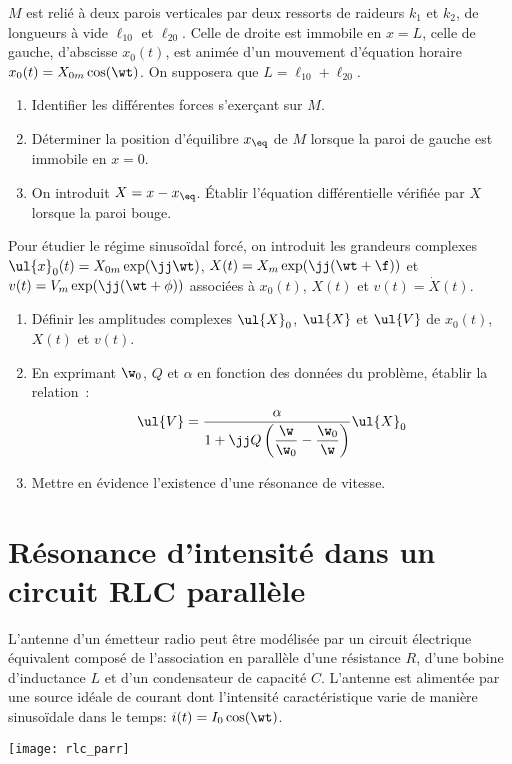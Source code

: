 \documentclass[a4paper, 12pt, final, garamond]{book}
\begin{document}
$M$ est relié à deux parois verticales par deux ressorts de raideurs $k_1$
et $k_2$, de longueurs à vide $\ell_{10}$ et $\ell_{20}$. Celle de droite est
immobile en $x = L$, celle de gauche, d'abscisse $x_0 (t)$, est animée d'un
mouvement d'équation horaire $x_0 (t) = X_{0m} \cos(\wt)$. On supposera
que $L = \ell_{10} + \ell_{20}$.

\begin{enumerate}
    \item Identifier les différentes forces s'exerçant sur $M$.
    \item Déterminer la position d'équilibre $x_{\eq}$ de $M$ lorsque la paroi
        de gauche est immobile en $x = 0$.
    \item On introduit $X = x - x_{\eq}$. Établir l'équation différentielle
        vérifiée par $X$ lorsque la paroi bouge.
\end{enumerate}
    Pour étudier le régime sinusoïdal forcé, on introduit les grandeurs
    complexes $\ul{x}_0(t) = X_{0m} \exp(\jj\wt)$, $X(t) = X_m \exp(\jj(\wt +
    \f))$ et $v(t) = V_m \exp(\jj(\wt + \phi))$ associées à $x_0(t)$, $X(t)$ et
    $v(t) = \dot X(t)$.
\begin{enumerate}[resume]
    \item Définir les amplitudes complexes $\ul{X}_0$, $\ul{X}$ et $\ul{V}$ de
        $x_0(t)$, $X(t)$ et $v(t)$.
    \item En exprimant $\w_0$, $Q$ et $\alpha$ en fonction des données du
        problème, établir la relation~: \[\ul{V} = \dfrac{\alpha}{1 +
        \jj Q\left(\dfrac{\w}{\w_0} - \dfrac{\w_0}{\w}\right)} \ul{X}_0\]
    \item Mettre en évidence l'existence d'une résonance de vitesse.
\end{enumerate}

\section{Résonance d'intensité dans un circuit RLC parallèle}

\begin{minipage}{0.60\linewidth}
    L'antenne d'un émetteur radio peut être modélisée par un circuit électrique
    équivalent composé de l'association en parallèle d'une résistance $R$,
    d'une bobine d'inductance $L$ et d'un condensateur de capacité $C$.
    \smallbreak
    L'antenne est alimentée par une source idéale de courant dont l'intensité
    caractéristique varie de manière sinusoïdale dans le temps: $i(t) = I_0
    \cos(\wt)$.
\end{minipage}
\hfill
\begin{minipage}{0.35\linewidth}
    \begin{center}
        \texttt{[image: rlc\_parr]}
    \end{center}
\end{minipage}
\end{document}
